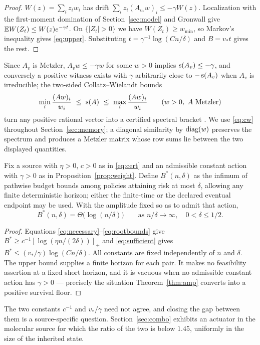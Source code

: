 \begin{proof}
$W(z)=\sum_iz_iw_i$ has drift $\sum_iz_i(A_{v_*}w)_i\le-\gamma W(z)$.
Localization with the first-moment domination of Section~\ref{sec:model} and
Gronwall give $\mathbb E W(Z_t)\le W(z)e^{-\gamma t}$. On $\{|Z_t|>0\}$ we have
$W(Z_t)\ge w_{\min}$, so Markov's inequality gives \eqref{eq:upper}.
Substituting $t=\gamma^{-1}\log(Cn/\delta)$ and $B=v_*t$ gives the rest.
\end{proof}

Since $A_{v}$ is Metzler, $A_vw\le-\gamma w$ for some $w>0$ implies
$\operatorname{s}(A_v)\le-\gamma$, and conversely a positive witness exists with
$\gamma$ arbitrarily close to $-\operatorname{s}(A_v)$ when $A_v$ is irreducible; the
two-sided Collatz--Wielandt bounds
\begin{equation}\label{eq:cw}
 \min_i\frac{(Aw)_i}{w_i}\ \le\ \operatorname{s}(A)\ \le\ \max_i\frac{(Aw)_i}{w_i}
 \qquad(w>0,\ A\ \text{Metzler})
\end{equation}
turn any positive rational vector into a certified spectral bracket
\citep{berman1994}. We use \eqref{eq:cw} throughout
Section~\ref{sec:memory}; a diagonal similarity by $\operatorname{diag}(w)$ preserves the
spectrum and produces a Metzler matrix whose row sums lie between the two
displayed quantities.

\begin{corollary}\label{cor:order}
Fix a source with $\eta>0$, $c>0$ as in \eqref{eq:cert} and an admissible
constant action with $\gamma>0$ as in Proposition~\ref{prop:weight}. Define
$B^*(n,\delta)$ as the infimum of pathwise budget bounds among policies
attaining risk at most $\delta$, allowing any finite deterministic horizon;
either the finite-time or the declared eventual endpoint may be used. With the
amplitude fixed so as to admit that action,
\[
 B^*(n,\delta)=\Theta\bigl(\log(n/\delta)\bigr)
 \qquad\text{as }n/\delta\to\infty,\quad0<\delta\le1/2 .
\]
\end{corollary}

\begin{proof}
Equations \eqref{eq:necessary}--\eqref{eq:rootbounds} give
$B^*\ge c^{-1}[\log(\eta n/(2\delta))]_+$ and \eqref{eq:sufficient} gives
$B^*\le(v_*/\gamma)\log(Cn/\delta)$. All constants are fixed independently of
$n$ and $\delta$. The upper bound supplies a finite horizon for each pair. It
makes no feasibility assertion at a fixed short horizon, and it is vacuous when
no admissible constant action has $\gamma>0$ --- precisely the situation
Theorem~\ref{thm:amp} converts into a positive survival floor.
\end{proof}

The two constants $c^{-1}$ and $v_*/\gamma$ need not agree, and closing the gap
between them is a source-specific question. Section~\ref{sec:combo} exhibits an
actuator in the molecular source for which the ratio of the two is below
$1.45$, uniformly in the size of the inherited state.
